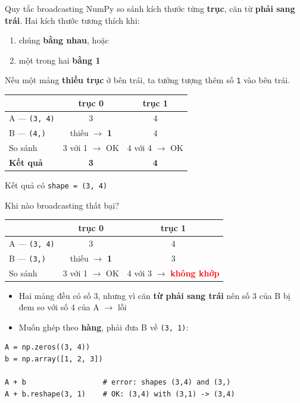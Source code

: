 \documentclass[11pt]{beamer}
\begin{document}
\begin{frame}{Quy tắc broadcasting}
NumPy so sánh kích thước từng \textbf{trục}, căn từ \textbf{phải sang trái}.
Hai kích thước tương thích khi:
\begin{enumerate}
  \item chúng \textbf{bằng nhau}, hoặc
  \item một trong hai \textbf{bằng 1}
\end{enumerate}
Nếu một mảng \textbf{thiếu trục} ở bên trái, ta tưởng tượng thêm số \texttt{1} vào bên trái.
\vspace{0.25cm}
\begin{center}
\small
\begin{tabular}{|l|c|c|}
\hline
 & \textbf{trục 0} & \textbf{trục 1} \\
\hline
A --- \texttt{(3, 4)} & 3 & 4 \\
B --- \texttt{(4,)}   & thiếu $\to$ \textbf{1} & 4 \\
\hline
So sánh & 3 với 1 $\to$ OK & 4 với 4 $\to$ OK \\
\hline
\textbf{Kết quả} & \textbf{3} & \textbf{4} \\
\hline
\end{tabular}
\end{center}
\centerline{\small Kết quả có \texttt{shape = (3, 4)}}
\end{frame}

\begin{frame}[fragile]{Khi nào broadcasting thất bại?}
\begin{center}
\small
\begin{tabular}{|l|c|c|}
\hline
 & \textbf{trục 0} & \textbf{trục 1} \\
\hline
A --- \texttt{(3, 4)} & 3 & 4 \\
B --- \texttt{(3,)}   & thiếu $\to$ \textbf{1} & 3 \\
\hline
So sánh & 3 với 1 $\to$ OK & 4 với 3 $\to$ \textcolor{red}{\textbf{không khớp}} \\
\hline
\end{tabular}
\end{center}
\begin{itemize}
  \item Hai mảng đều có số 3, nhưng vì căn \textbf{từ phải sang trái} nên số 3 của B
        bị đem so với số 4 của A $\to$ lỗi
  \item Muốn ghép theo \textbf{hàng}, phải đưa B về \texttt{(3, 1)}:
\end{itemize}
\begin{lstlisting}
A = np.zeros((3, 4))
b = np.array([1, 2, 3])

A + b                  # error: shapes (3,4) and (3,)
A + b.reshape(3, 1)    # OK: (3,4) with (3,1) -> (3,4)
\end{lstlisting}
\end{frame}
\end{document}
